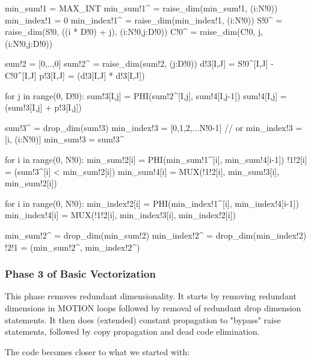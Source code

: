 {\small
\begin{pythonn}
min_sum!1 = MAX_INT
min_sum!1^ = raise_dim(min_sum!1, (i:N!0))
min_index!1 = 0
min_index!1^ = raise_dim(min_index!1, (i:N!0))
S!0^ = raise_dim(S!0, ((i * D!0) + j), (i:N!0,j:D!0))
C!0^ = raise_dim(C!0, j, (i:N!0,j:D!0))

sum!2 = [0,..,0]
sum!2^ = raise_dim(sum!2, (j:D!0))
d!3[I,J] = S!0^[I,J] - C!0^[I,J]
p!3[I,J] = (d!3[I,J] * d!3[I,J])

for j in range(0, D!0):
  sum!3[I,j] = PHI(sum!2^[I,j], sum!4[I,j-1])       
  sum!4[I,j] = (sum!3[I,j] + p!3[I,j])

sum!3^ = drop_dim(sum!3)     
min_index!3 = [0,1,2,...N!0-1] // or min_index!3 = [i, (i:N!0)]
min_sum!3 = sum!3^

for i in range(0, N!0):
  min_sum!2[i] = PHI(min_sum!1^[i], min_sum!4[i-1]) 
  !1!2[i] = (sum!3^[i] < min_sum!2[i])
  min_sum!4[i] = MUX(!1!2[i], min_sum!3[i], min_sum!2[i])
    
for i in range(0, N!0):
  min_index!2[i] = PHI(min_index!1^[i], min_index!4[i-1])  
   min_index!4[i] = MUX(!1!2[i], min_index!3[i], min_index!2[i])

min_sum!2^ = drop_dim(min_sum!2)
min_index!2^ = drop_dim(min_index!2)   
!2!1 = (min_sum!2^, min_index!2^)
\end{pythonn}
}



\subsubsection{Phase 3 of Basic Vectorization}

This phase removes redundant dimensionality. 
It starts by removing redundant dimensions in MOTION loops followed
by removal of redundant drop dimension statements.
It then does (extended) constant propagation 
to "bypass" raise statements, followed by copy propagation
and dead code elimination.

The code becomes closer to what we started with:

